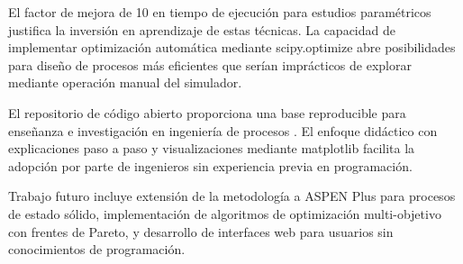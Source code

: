 \documentclass{syx7}
\begin{document}
El factor de mejora de 10 en tiempo de ejecución para estudios paramétricos justifica la inversión en aprendizaje de estas técnicas. La capacidad de implementar optimización automática mediante scipy.optimize \cite{virtanen2020scipy} abre posibilidades para diseño de procesos más eficientes que serían imprácticos de explorar mediante operación manual del simulador.

El repositorio de código abierto proporciona una base reproducible para enseñanza e investigación en ingeniería de procesos \cite{seider2016product,turton2018analysis,fogler2016elements}. El enfoque didáctico con explicaciones paso a paso y visualizaciones mediante matplotlib \cite{hunter2007matplotlib} facilita la adopción por parte de ingenieros sin experiencia previa en programación.

Trabajo futuro incluye extensión de la metodología a ASPEN Plus para procesos de estado sólido, implementación de algoritmos de optimización multi-objetivo con frentes de Pareto, y desarrollo de interfaces web para usuarios sin conocimientos de programación.

\printauthoremails

\pretocmd{\printbibliography}{\vspace{1em}}{}{}
\printbibliography
\end{document}
